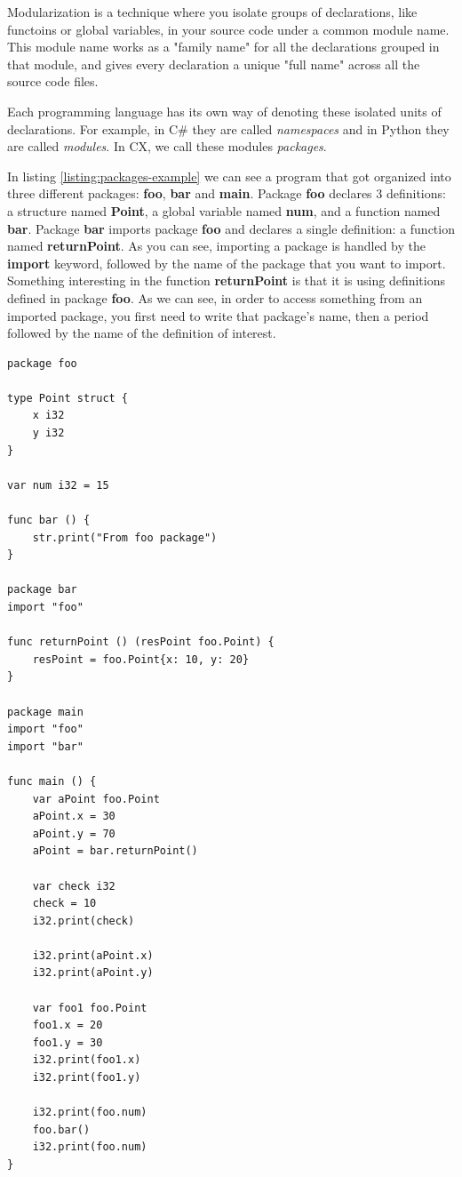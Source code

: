 \documentclass[11pt,fleqn,openany]{book} %
\begin{document}
Modularization is a technique where you isolate groups of declarations, like functoins or global variables, in your source code under a common module name. This module name works as a "family name" for all the declarations grouped in that module, and gives every declaration a unique "full name" across all the source code files.

Each programming language has its own way of denoting these isolated units of declarations. For example, in C\# they are called \emph{namespaces} and in Python they are called \emph{modules}. In  CX, we call these modules \emph{packages}.

In listing \ref{listing:packages-example} we can see a program that got organized into three different packages: \textbf{foo}, \textbf{bar} and \textbf{main}. Package \textbf{foo} declares 3 definitions: a structure named \textbf{Point}, a global variable named \textbf{num}, and a function named \textbf{bar}. Package \textbf{bar} imports package \textbf{foo} and declares a single definition: a function named \textbf{returnPoint}. As you can see, importing a package is handled by the \textbf{import} keyword, followed by the name of the package that you want to import. Something interesting in the function \textbf{returnPoint} is that it is using definitions defined in package \textbf{foo}. As we can see, in order to access something from an imported package, you first need to write that package's name, then a period followed by the name of the definition of interest.

\begin{lstlisting}[caption={Importing packages example},captionpos=b,label={listing:packages-example}]
package foo

type Point struct {
	x i32
	y i32
}

var num i32 = 15

func bar () {
	str.print("From foo package")
}

package bar
import "foo"

func returnPoint () (resPoint foo.Point) {
	resPoint = foo.Point{x: 10, y: 20}
}

package main
import "foo"
import "bar"

func main () {
	var aPoint foo.Point
	aPoint.x = 30
	aPoint.y = 70
	aPoint = bar.returnPoint()

	var check i32
	check = 10
	i32.print(check)
	
	i32.print(aPoint.x)
	i32.print(aPoint.y)

	var foo1 foo.Point
	foo1.x = 20
	foo1.y = 30
	i32.print(foo1.x)
	i32.print(foo1.y)
	
	i32.print(foo.num)
	foo.bar()
	i32.print(foo.num)
}
\end{lstlisting}
\end{document}
